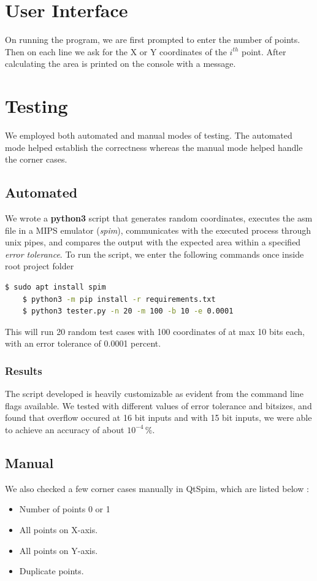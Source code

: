 \documentclass[hidelinks,12pt]{article}
\begin{document}
\section{User Interface}
On running the program, we are first prompted to enter the number of points.
Then on each line we ask for the X or Y coordinates of the \(i^{th}\) point.
After calculating the area is printed on the console with a message.

\section{Testing}
We employed both automated and manual modes of testing. The automated mode helped establish the correctness whereas the manual mode helped handle the corner cases.
\subsection{Automated}
We wrote a \textbf{python3} script that generates random coordinates, executes the asm file in a MIPS emulator (\textit{spim}), communicates with the executed process through unix pipes, and compares the
output with the expected area within a specified \textit{error tolerance}. To run the script, we enter the following commands once inside root project folder
\begin{lstlisting}[language=bash]
    $ sudo apt install spim
    $ python3 -m pip install -r requirements.txt
    $ python3 tester.py -n 20 -m 100 -b 10 -e 0.0001 
\end{lstlisting}

This will run 20 random test cases with 100 coordinates of at max 10 bits each,
with an error tolerance of  0.0001 percent. \\[0.2cm]

\subsubsection{Results}
The script developed is heavily customizable as evident from the command line flags available.
We tested with different values of error tolerance and bitsizes, and found that overflow occured at 16 bit inputs
and with 15 bit inputs, we were able to achieve an accuracy of about \(10^{-4}\,\%\). 
\newpage
\subsection{Manual}
We also checked a few corner cases manually in QtSpim, which are listed below : 
\begin{itemize}
    \item Number of points 0 or 1
    \item All points on X-axis.
    \item All points on Y-axis.
    \item Duplicate points.
\end{itemize}
\end{document}
